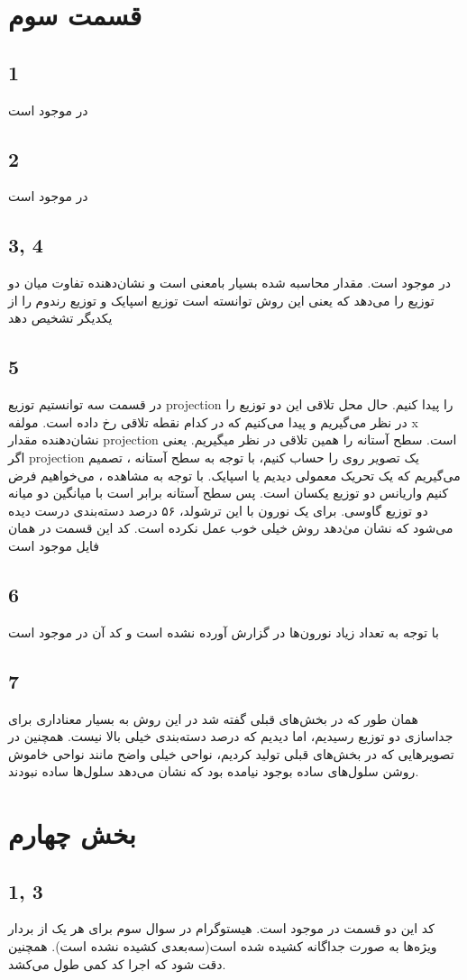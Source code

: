 \documentclass[12 pt]{article}
\begin{document}
\section*{قسمت سوم}
\subsection*{1}
در 
موجود است
\subsection*{2}
در 
موجود است
\subsection*{3, 4}
در 
موجود است. مقدار 
محاسبه شده بسیار بامعنی است و نشان‌دهنده تفاوت میان دو توزیع را می‌دهد که یعنی این روش توانسته است توزیع اسپایک و توزیع رندوم را از یکدیگر تشخیص دهد
\subsection*{5}
در قسمت سه توانستیم توزیع projection را پیدا کنیم. حال محل تلاقی این دو توزیع را در نظر می‌گیریم و پیدا می‌کنیم که در کدام نقطه تلاقی رخ داده است. مولفه x نشان‌دهنده مقدار projection است. سطح آستانه را همین تلاقی در نظر میگیریم. یعنی اگر projection یک تصویر روی 
را حساب کنیم، با توجه به سطح آستانه ، تصمیم می‌گیریم که یک تحریک معمولی دیدیم یا اسپایک. با توجه به مشاهده ، می‌خواهیم فرض کنیم واریانس دو توزیع یکسان است. پس سطح آستانه برابر است با میانگین دو میانه دو توزیع گاوسی. برای یک نورون با این ترشولد، ۵۶ درصد دسته‌بندی درست دیده می‌شود که نشان می‌ٰدهد روش خیلی خوب عمل نکرده است. کد این قسمت در همان فایل
موجود است
\subsection*{6}
با توجه به تعداد زیاد نورون‌ها در گزارش آورده نشده است و کد آن در 
موجود است
\subsection*{7}
همان طور که در بخش‌های قبلی گفته شد در این روش به 
بسیار معناداری برای جداسازی دو توزیع رسیدیم، اما دیدیم که درصد دسته‌بندی خیلی بالا نیست. همچنین در تصویرهایی که در بخش‌های قبلی تولید کردیم، نواحی خیلی واضح مانند نواحی خاموش روشن سلول‌های ساده بوجود نیامده بود که نشان می‌دهد سلول‌ها ساده نبودند.
\section*{بخش چهارم}
\subsection*{1, 3}
کد این دو قسمت در 
موجود است. هیستوگرام در سوال سوم برای هر یک از بردار ویژه‌ها به صورت جداگانه کشیده شده است(سه‌بعدی کشیده نشده است).  همچنین دقت شود که اجرا کد کمی طول می‌کشد.\\
\end{document}
